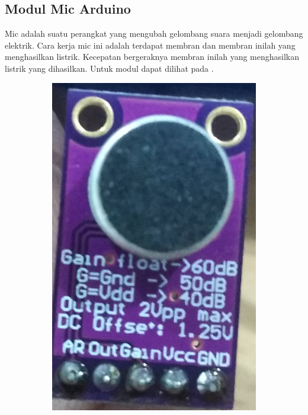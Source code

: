 \documentclass[11pt]{article}
\begin{document}
\subsection{Modul Mic Arduino}
Mic adalah suatu perangkat yang mengubah gelombang suara menjadi gelombang elektrik.
Cara kerja mic ini adalah  terdapat membran dan membran inilah yang menghasilkan listrik.
Kecepatan bergeraknya membran inilah yang menghasilkan listrik yang dihasilkan.
Untuk modul dapat dilihat pada \label{fig:MAX9814}.
\begin{figure}[h!]
	\centering
	\begin{subfigure}[b]{0.39\linewidth}
		\includegraphics[width=\linewidth]{dokumentasi/MIC/1.jpg}

\end{subfigure}
\end{figure}
\end{document}
